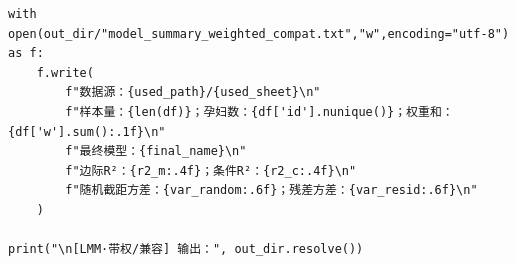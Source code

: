\begin{lstlisting}
with open(out_dir/"model_summary_weighted_compat.txt","w",encoding="utf-8") as f:
    f.write(
        f"数据源：{used_path}/{used_sheet}\n"
        f"样本量：{len(df)}；孕妇数：{df['id'].nunique()}；权重和：{df['w'].sum():.1f}\n"
        f"最终模型：{final_name}\n"
        f"边际R²：{r2_m:.4f}；条件R²：{r2_c:.4f}\n"
        f"随机截距方差：{var_random:.6f}；残差方差：{var_resid:.6f}\n"
    )

print("\n[LMM·带权/兼容] 输出：", out_dir.resolve())


\end{lstlisting}